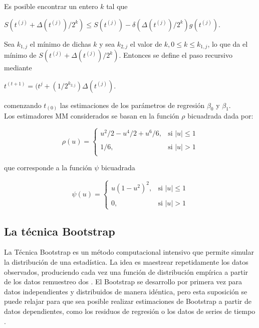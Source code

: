 Es posible encontrar un entero $k$ \parencite{yohai-1987} tal que\\

\begin{center}
{\large	$ S(t^{(j)} + \Delta(t^{(j)} )/2^{k}) \leq S(t^{(j)}) - \delta( \Delta(t^{(j)} )/2^{k} ) g(t^{(j)})$}. \\
\end{center}


Sea $k_{1,j}$ el mínimo de dichas $k$ y sea $k_{2,j}$ el valor de $k, 0 \leq k  \leq k_{1,j}$, lo que da el mínimo de $S(t^{(j)} + \Delta(t^{(j)} )/2^{k})$. Entonces se define el paso recursivo mediante\\

\begin{center}
{\large	$ t^{(t+1)} = (t^{j} + (1/2^{k_{2,j}}) \Delta(t^{(j)} )$}.\\
\end{center}

comenzando $t_{(0)} $ las estimaciones de los parámetros de regresión $\beta_{0}$ y $\beta_{1}$.\\

Los estimadores MM considerados se basan en la función $\rho$ bicuadrada dada por:


\[
\rho(u) =
\begin{cases}
	u^{2}/2 -u^{4}/2 + u^{6}/6	, & \text{si } |u| \leq 1 \\ \\
	1/6,     & \text{si } | u | > 1\\
\end{cases}
\]


que corresponde a la función $\psi$ bicuadrada

\[
\psi(u) =
\begin{cases}
	u(1- u^{2})^{2}	, & \text{si } |u| \leq 1 \\ \\
	0,     & \text{si } | u | > 1
\end{cases}
\]



\subsection{La técnica Bootstrap}

La Técnica Bootstrap es un método computacional intensivo que permite simular la distribución de una estadística. La idea es maestrear repetidamente los datos observados, produciendo cada vez una función de distribución empírica a partir de los datos remuestreo dos \parencite{zacarias-2023}. El Bootstrap se desarrollo por primera vez para datos independientes y distribuidos de manera idéntica, pero esta suposición se puede relajar para que sea posible realizar estimaciones de Bootstrap a partir de datos dependientes, como los residuos de regresión o los datos de series de tiempo \parencite{givens-2013}.\\


